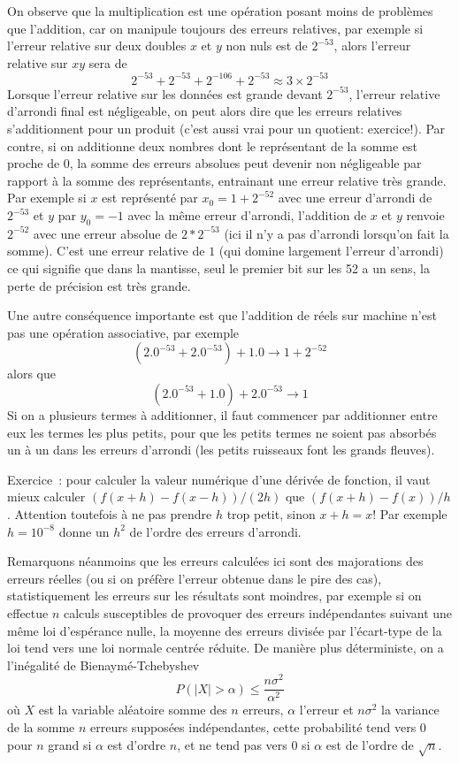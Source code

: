 \documentclass[a4paper,11pt]{article}
\begin{document}
On observe que la multiplication est une opération posant moins
de problèmes que l'addition, car on manipule toujours des erreurs
relatives, par exemple si l'erreur relative sur deux doubles
$x$ et $y$ non nuls
est de $2^{-53}$, alors l'erreur relative sur $xy$ sera de 
\[ 2^{-53} + 2^{-53} + 2^{-106} + 2^{-53} \approx 3 \times 2^{-53} \]
Lorsque l'erreur relative sur les données est grande devant $2^{-53}$,
l'erreur relative d'arrondi final est négligeable, on peut alors dire que
les erreurs relatives s'additionnent pour un produit (c'est aussi vrai
pour un quotient: exercice!).
Par contre, si on additionne deux nombres dont le représentant de
la somme est proche de 0, la somme des erreurs absolues peut
devenir non négligeable par rapport à la somme des représentants, entrainant
une erreur relative très grande. Par exemple si $x$ est représenté
par $x_0=1+2^{-52}$ avec
une erreur d'arrondi de $2^{-53}$ et
$y$ par $y_0=-1$ avec la même erreur d'arrondi, 
l'addition de $x$ et $y$ renvoie $2^{-52}$ avec une erreur
absolue de $2 * 2^{-53}$ (ici il n'y a pas d'arrondi lorsqu'on fait la somme).
C'est une erreur relative de $1$ (qui domine largement
l'erreur d'arrondi) ce qui signifie que dans la mantisse, seul le
premier bit sur les 52 a un sens, la perte de précision est très grande.

Une autre conséquence importante est que l'addition de réels sur machine
n'est pas une opération associative,
par exemple
\[ (2.0^{-53}+2.0^{-53})+1.0 \rightarrow 1+2^{-52} \]
alors que
\[ (2.0^{-53}+1.0)+2.0^{-53} \rightarrow 1 \]
Si on a plusieurs termes
à additionner, il faut commencer par additionner entre eux
les termes les plus petits, pour que les petits termes ne soient
pas absorbés un à un dans les erreurs d'arrondi (les petits ruisseaux
font les grands fleuves).

Exercice~: pour calculer la valeur
num\'erique d'une d\'eriv\'ee de fonction, il vaut mieux
calculer $(f(x+h)-f(x-h))/(2h)$ que $(f(x+h)-f(x))/h$. Attention
toutefois \`a ne pas prendre $h$ trop petit, sinon $x+h=x$! Par
exemple $h=10^{-8}$ donne un $h^2$ de l'ordre des erreurs d'arrondi.

Remarquons néanmoins que les erreurs calculées ici sont des majorations
des erreurs réelles (ou si on préfère l'erreur obtenue dans le pire
des cas), statistiquement les erreurs sur les résultats sont moindres,
par exemple si on effectue $n$ calculs susceptibles de provoquer
des erreurs ind\'ependantes suivant une m\^eme loi d'esp\'erance nulle, la moyenne des
erreurs divis\'ee par l'\'ecart-type de la loi
tend vers une loi normale centr\'ee r\'eduite. De mani\`ere plus
d\'eterministe, on a l'in\'egalit\'e de Bienaym\'e-Tchebyshev
\[ P(|X|>\alpha) \leq \frac{n\sigma^2}{\alpha^2}\]
o\`u $X$ est la variable al\'eatoire somme des $n$ erreurs, $\alpha$
l'erreur et $n\sigma^2$ la variance de la somme $n$ erreurs
suppos\'ees ind\'ependantes, cette probabilit\'e tend vers 0 pour $n$
grand si $\alpha$ est d'ordre $n$, et ne tend
pas vers 0 si $\alpha$ est de l'ordre de $\sqrt{n}$.
\end{document}
